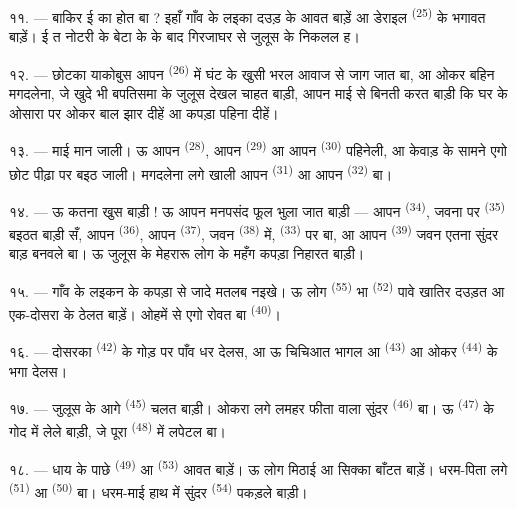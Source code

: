 ११. --- बाकिर ई का होत बा ? इहाँ गाँव के लइका दउड़ के आवत बाड़ें आ डेराइल
 \textsuperscript{(25)} के भगावत बाड़ें। ई त नोटरी के बेटा के
 के बाद गिरजाघर से जुलूस के निकलल ह।

१२. --- छोटका याकोबुस आपन  \textsuperscript{(26)} में
घंट के खुसी भरल आवाज से जाग जात बा, आ ओकर बहिन मगदलेना, जे खुदे भी
बपतिसमा के जुलूस देखल चाहत बाड़ी, आपन माई से बिनती करत बाड़ी कि घर के
ओसारा पर ओकर बाल झार दीहें आ कपड़ा पहिना दीहें।

१३. --- माई मान जाली। ऊ आपन  \textsuperscript{(28)}, आपन
 \textsuperscript{(29)} आ आपन  \textsuperscript{(30)}
पहिनेली, आ केवाड़ के सामने एगो छोट पीढ़ा पर बइठ जाली। मगदलेना लगे खाली
आपन  \textsuperscript{(31)} आ आपन 
\textsuperscript{(32)} बा।

१४. --- ऊ कतना खुस बाड़ी ! ऊ आपन मनपसंद फूल भुला जात बाड़ी — आपन
 \textsuperscript{(34)}, जवना पर 
\textsuperscript{(35)} बइठत बाड़ी सँ, आपन 
\textsuperscript{(36)}, आपन  \textsuperscript{(37)},
जवन  \textsuperscript{(38)} में, 
\textsuperscript{(33)} पर बा, आ आपन  \textsuperscript{(39)}
जवन एतना सुंदर बाड़ बनवले बा। ऊ जुलूस के मेहरारू लोग के महँग कपड़ा
निहारत बाड़ी।

१५. --- गाँव के लइकन के कपड़ा से जादे मतलब नइखे। ऊ लोग
 \textsuperscript{(55)} भा 
\textsuperscript{(52)} पावे खातिर दउड़त आ एक-दोसरा के ठेलत बाड़ें। ओहमें
से एगो रोवत बा \textsuperscript{(40)}।

१६. --- दोसरका  \textsuperscript{(42)} के गोड़ पर पाँव धर
देलस, आ ऊ चिचिआत भागल आ  \textsuperscript{(43)} आ ओकर
 \textsuperscript{(44)} के भगा देलस।

\VUsaut{5.0mm}
\VUsaut{4.0mm}

१७. --- जुलूस के आगे  \textsuperscript{(45)} चलत बाड़ी।
ओकरा लगे लमहर फीता वाला सुंदर  \textsuperscript{(46)} बा। ऊ
 \textsuperscript{(47)} के गोद में लेले बाड़ी, जे पूरा
 \textsuperscript{(48)} में लपेटल बा।

१८. --- धाय के पाछे  \textsuperscript{(49)} आ
 \textsuperscript{(53)} आवत बाड़ें। ऊ लोग मिठाई आ सिक्का
बाँटत बाड़ें। धरम-पिता लगे  \textsuperscript{(51)} आ
 \textsuperscript{(50)} बा। धरम-माई हाथ में सुंदर
 \textsuperscript{(54)} पकड़ले बाड़ी।

